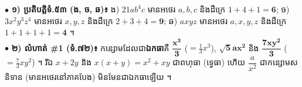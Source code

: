 \documentclass[a4paper,10pt]{article}
\begin{document}
\begin{tcolorbox}[
  enhanced, sharp corners, colback=white, colframe=black,
  boxrule=0.8pt, boxsep=2pt, top=4pt, bottom=4pt, left=6pt, right=6pt
]
  \fontsize{8.8pt}{13.2pt}\selectfont
  $\bullet$ \textbf{១) ប្រតិបត្តិទំ.៥៣ (ង, ច, ឆ)៖} ង) $21ab^4c$ មានអថេរ $a, b, c$ និងដឺក្រេ $1+4+1 = \mathbf{6}$; \quad ច) $3x^2y^3z^4$ មានអថេរ $x, y, z$ និងដឺក្រេ $2+3+4 = \mathbf{9}$; \quad ឆ) $axyz$ មានអថេរ $a, x, y, z$ និងដឺក្រេ $1+1+1+1 = \mathbf{4}$ ។\\[2pt]
  $\bullet$ \textbf{២) លំហាត់ \#1 (ទំ.៧២)៖} កន្សោមដែលជា\textbf{ឯកធា}គឺ $\mathbf{\dfrac{x^3}{3}}$ ($= \frac{1}{3}x^3$), $\mathbf{\sqrt{5}ax^2}$ និង $\mathbf{\dfrac{7xy^2}{3}}$ ($= \frac{7}{3}xy^2$) ។ រីឯ $x+2y$ និង $x(x+y) = x^2+xy$ ជាពហុធា (ទ្វេធា) ហើយ $\dfrac{a}{x^2}$ ជាកន្សោមសនិទាន (មានអថេរនៅភាគបែង) មិនមែនជាឯកធាឡើយ ។
\end{tcolorbox}
\end{document}
